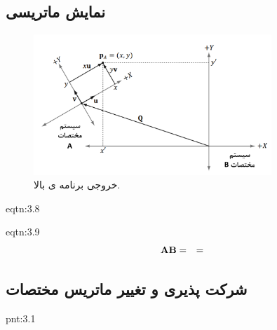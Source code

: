 \subsection{\textbf{نمایش ماتریسی}}
{
    \Large
    \begin{spacing}{1.5}
        \begin{figure}[H]
            \centering
            \setlength{\belowcaptionskip}{-10pt}
            \includegraphics[width=0.8\textwidth]{Images/4/3/4.Session.1.3.12}
            \caption {خروجی برنامه ی بالا.}
            \label{fig:4.Session.1.3.12}
        \end{figure}

        \begin{eqtn}{eqtn:3.8}
            \centering
        \end{eqtn}

        \begin{eqtn}{eqtn:3.9}
            \begin{equation*}
                \centering
                \begin{split}
                    \textbf{AB}&=
                    &=
                \end{split}
            \end{equation*}
            \centering
        \end{eqtn}

    \end{spacing}
}

\subsection{\textbf{شرکت پذیری و تغییر ماتریس مختصات}}
{
    \Large
    \begin{spacing}{1.5}
        \begin{center}
        \end{center}

        \begin{point}{pnt:3.1}
            \Large
        \end{point}

    \end{spacing}
}

